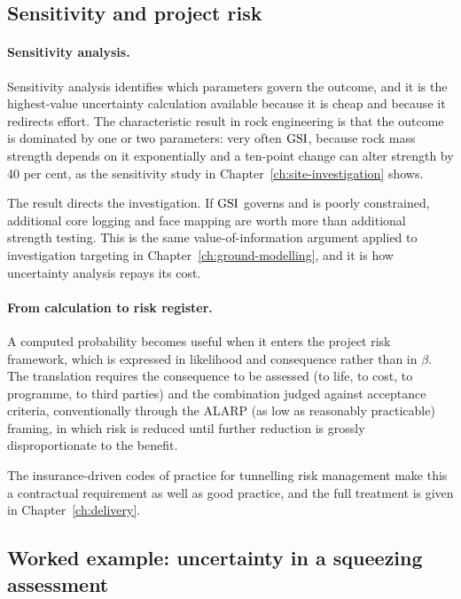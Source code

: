 \subsection{Sensitivity and project risk}
\label{sec:sensitivity-and-project-risk}

\paragraph{Sensitivity analysis.}
Sensitivity analysis identifies which parameters govern the outcome, and it is
the highest-value uncertainty calculation available because it is cheap and
because it redirects effort. The characteristic result in rock engineering is
that the outcome is dominated by one or two parameters: very often $\mathrm{GSI}$,
because rock mass strength depends on it exponentially and a ten-point change
can alter strength by 40 per cent, as the sensitivity study in
Chapter~\ref{ch:site-investigation} shows.

The result directs the investigation. If $\mathrm{GSI}$
governs and is poorly constrained, additional core logging and face mapping
are worth more than additional strength testing. This is the same
value-of-information argument applied to investigation targeting in
Chapter~\ref{ch:ground-modelling}, and it is how
uncertainty analysis repays its cost.

\paragraph{From calculation to risk register.}
A computed probability becomes useful when it enters the project risk
framework, which is expressed in likelihood and consequence rather than in $\beta$.
The translation requires the consequence to be assessed (to life, to cost,
to programme, to third parties) and the combination judged against
acceptance criteria, conventionally through the ALARP (as low as reasonably
practicable) framing, in which risk is reduced until further reduction is grossly disproportionate to the benefit.

The insurance-driven codes of practice for tunnelling risk management make
this a contractual requirement as well as good practice, and the
full treatment is given in Chapter~\ref{ch:delivery}.

\subsection{Worked example: uncertainty in a squeezing assessment}
\label{sec:reliability-support-uncertainty}

